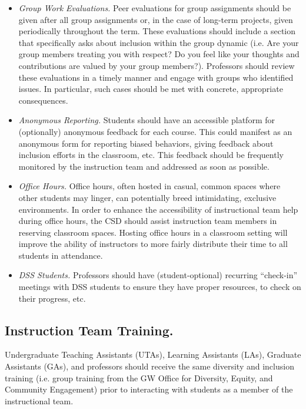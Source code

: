 \documentclass{article}
\begin{document}
\begin{itemize}
\item
\emph{Group Work Evaluations.} Peer evaluations for group assignments should be given after all group assignments 
or, in the case of long-term projects, given periodically throughout the term. These evaluations should include a 
section that specifically asks about inclusion within the group dynamic (i.e. Are your group members treating 
you with respect? Do you feel like your thoughts and contributions are valued by your group members?). Professors 
should review these evaluations in a timely manner and engage with groups who identified issues. 
In particular, such cases should be met with concrete, appropriate consequences.

\item
\emph{Anonymous Reporting.} 
Students should have an accessible platform for (optionally) anonymous feedback for each course. 
This could manifest as an anonymous form for reporting biased behaviors, giving feedback about inclusion efforts 
in the classroom, etc. This feedback should be frequently monitored by the instruction team and addressed as soon 
as possible. 

\item 
\emph{Office Hours.} 
Office hours, often hosted in casual, common spaces where other students may linger, 
can potentially breed intimidating, exclusive environments. In order to enhance the accessibility of 
instructional team help during office hours, the CSD should assist instruction team members in reserving 
classroom spaces. Hosting office hours in a classroom setting will improve the ability of instructors to more 
fairly distribute their time to all students in attendance. 

\item
\emph{DSS Students.} 
Professors should have (student-optional) recurring “check-in” meetings with DSS students to 
ensure they have proper resources, to check on their progress, etc.
\end{itemize}

\subsection{Instruction Team Training.} 
Undergraduate Teaching Assistants (UTAs), Learning Assistants (LAs), Graduate Assistants (GAs), and 
professors should receive the same diversity and inclusion training (i.e. group training from the GW Office 
for Diversity, Equity, and Community Engagement) prior to interacting with students as a member of the 
instructional team. 
\end{document}
